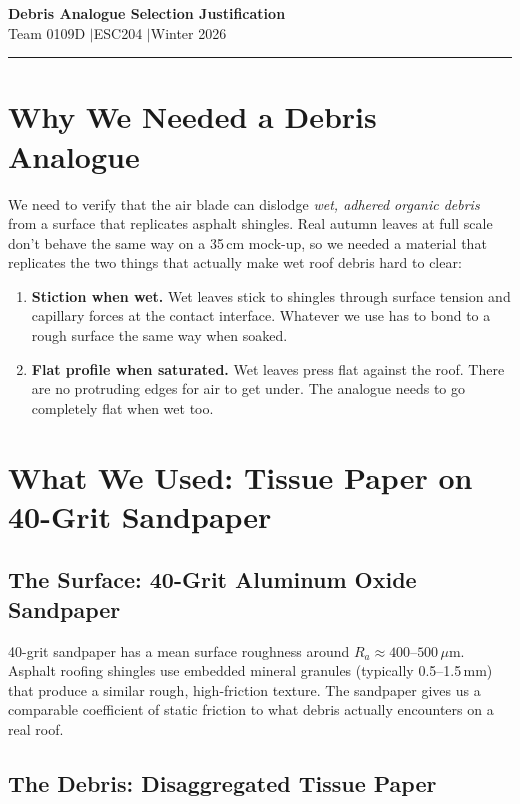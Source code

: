 \documentclass[12pt, letterpaper]{article}
\begin{document}
\begin{center}
{\Large\textbf{Debris Analogue Selection Justification}}\\[2pt]
{\normalsize Team 0109D \quad$\vert$\quad ESC204 \quad$\vert$\quad Winter 2026}
\end{center}
\noindent\rule{\textwidth}{0.6pt}\vspace{6pt}

\section{Why We Needed a Debris Analogue}

We need to verify that the air blade can dislodge \textit{wet, adhered organic debris} from a surface that replicates asphalt shingles. Real autumn leaves at full scale don't behave the same way on a 35\,cm mock-up, so we needed a material that replicates the two things that actually make wet roof debris hard to clear:

\begin{enumerate}
    \item \textbf{Stiction when wet.} Wet leaves stick to shingles through surface tension and capillary forces at the contact interface. Whatever we use has to bond to a rough surface the same way when soaked.
    \item \textbf{Flat profile when saturated.} Wet leaves press flat against the roof. There are no protruding edges for air to get under. The analogue needs to go completely flat when wet too.
\end{enumerate}

\section{What We Used: Tissue Paper on 40-Grit Sandpaper}

\subsection*{The Surface: 40-Grit Aluminum Oxide Sandpaper}

40-grit sandpaper has a mean surface roughness around $R_a \approx 400$--$500\,\mu$m. Asphalt roofing shingles use embedded mineral granules (typically 0.5--1.5\,mm) that produce a similar rough, high-friction texture. The sandpaper gives us a comparable coefficient of static friction to what debris actually encounters on a real roof.

\subsection*{The Debris: Disaggregated Tissue Paper}
\end{document}

